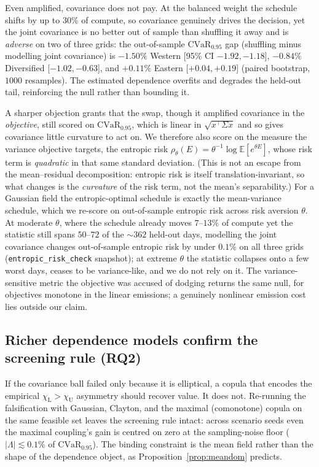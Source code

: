 \documentclass[12pt]{article}
\newcommand{\CVaR}{\mathrm{CVaR}}
\newcommand{\chiU}{\chi_{\mathrm{U}}}
\newcommand{\chiL}{\chi_{\mathrm{L}}}
\begin{document}
Even amplified, covariance does not pay. At the balanced weight the schedule shifts by up to
$30\%$ of compute, so covariance genuinely drives the decision, yet the joint covariance is no
better out of sample than shuffling it away and is \emph{adverse} on two of three grids: the
out-of-sample $\CVaR_{0.95}$ gap (shuffling minus modelling joint covariance) is $-1.50\%$
Western [95\% CI $-1.92,-1.18$], $-0.84\%$ Diversified [$-1.02,-0.63$], and $+0.11\%$ Eastern
[$+0.04,+0.19$] (paired bootstrap, $1000$ resamples). The estimated dependence overfits and
degrades the held-out tail, reinforcing the null rather than bounding it.

A sharper objection grants that the swap, though it amplified covariance in the
\emph{objective}, still scored on $\CVaR_{0.95}$, which is linear in $\sqrt{x^\top\Sigma x}$
and so gives covariance little curvature to act on. We therefore also score on the measure
the variance objective targets, the entropic risk
$\rho_\theta(E)=\theta^{-1}\log\mathbb{E}[e^{\theta E}]$, whose risk term is \emph{quadratic}
in that same standard deviation. (This is not an escape from the mean--residual decomposition:
entropic risk is itself translation-invariant, so what changes is the \emph{curvature} of the
risk term, not the mean's separability.) For a Gaussian field the entropic-optimal schedule is
exactly the mean-variance schedule, which we re-score on out-of-sample entropic risk across
risk aversion $\theta$. At moderate $\theta$, where the schedule already moves $7$--$13\%$ of
compute yet the statistic still spans $50$--$72$ of the ${\sim}362$ held-out days, modelling
the joint covariance changes out-of-sample entropic risk by under $0.1\%$ on all three grids
(\texttt{entropic\_risk\_check} snapshot); at extreme $\theta$ the statistic collapses onto a
few worst days, ceases to be variance-like, and we do not rely on it. The variance-sensitive
metric the objective was accused of dodging returns the same null, for objectives monotone in
the linear emissions; a genuinely nonlinear emission cost lies outside our claim.


\subsection{Richer dependence models confirm the screening rule (RQ2)}\label{sec:res-copula}
If the covariance ball failed only because it is elliptical, a copula that encodes
the empirical $\chiL>\chiU$ asymmetry should recover value. It does not. Re-running
the falsification with Gaussian, Clayton, and the maximal (comonotone) copula on the
same feasible set leaves the screening rule intact: across scenario seeds even the
maximal coupling's gain is centred on zero at the sampling-noise floor
($|\Lambda|\lesssim0.1\%$ of $\CVaR_{0.95}$). The binding constraint is the mean
field rather than the shape of the dependence object, as
Proposition~\ref{prop:meandom} predicts.
\end{document}
